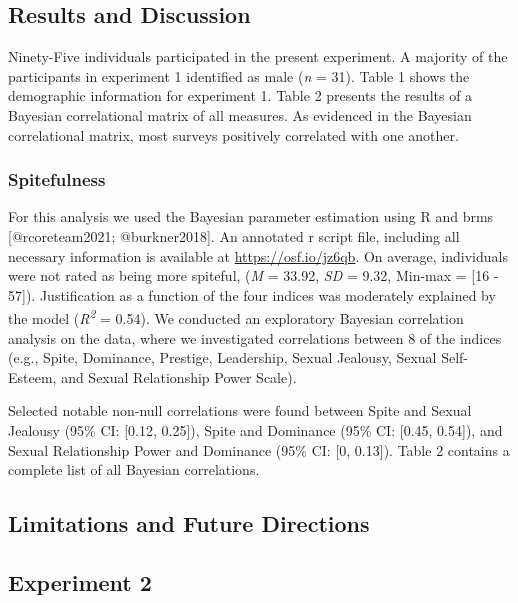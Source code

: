 \documentclass[
]{article}
\begin{document}
\hypertarget{results-and-discussion}{%
\subsection{Results and Discussion}\label{results-and-discussion}}

Ninety-Five individuals participated in the present experiment. A
majority of the participants in experiment 1 identified as male
(\emph{n} = 31). Table 1 shows the demographic information for
experiment 1. Table 2 presents the results of a Bayesian correlational
matrix of all measures. As evidenced in the Bayesian correlational
matrix, most surveys positively correlated with one another.

\hypertarget{spitefulness}{%
\subsubsection{Spitefulness}\label{spitefulness}}

For this analysis we used the Bayesian parameter estimation using R and
brms {[}@rcoreteam2021; @burkner2018{]}. An annotated r script file,
including all necessary information is available at
\url{https://osf.io/jz6qb}. On average, individuals were not rated as
being more spiteful, (\emph{M} = 33.92, \emph{SD} = 9.32, Min-max =
{[}16 - 57{]}). Justification as a function of the four indices was
moderately explained by the model (\emph{R\textsuperscript{2}} = 0.54).
We conducted an exploratory Bayesian correlation analysis on the data,
where we investigated correlations between 8 of the indices (e.g.,
Spite, Dominance, Prestige, Leadership, Sexual Jealousy, Sexual
Self-Esteem, and Sexual Relationship Power Scale).

Selected notable non-null correlations were found between Spite and
Sexual Jealousy (95\% CI: {[}0.12, 0.25{]}), Spite and Dominance (95\%
CI: {[}0.45, 0.54{]}), and Sexual Relationship Power and Dominance (95\%
CI: {[}0, 0.13{]}). Table 2 contains a complete list of all Bayesian
correlations.

\hypertarget{limitations-and-future-directions}{%
\subsection{Limitations and Future
Directions}\label{limitations-and-future-directions}}

\hypertarget{experiment-2}{%
\subsection{Experiment 2}\label{experiment-2}}
\end{document}

